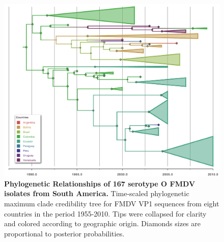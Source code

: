 \documentclass[10pt]{article}
\begin{document}
\newpage
\begin{figure}[!ht]
\begin{center}
\includegraphics[scale=.60]{FIGURES/O.pdf}
\end{center}
\caption{
{\bf Phylogenetic Relationships of 167 serotype O FMDV isolates from South America.} Time-scaled phylogenetic maximum clade credibility tree for FMDV VP1 sequences from eight countries in the period 1955-2010. Tips were collapsed for clarity and colored according to geographic origin. Diamonds sizes are proportional to posterior probabilities.\\
}
\label{fig:Otree}
\end{figure}
\newpage
\end{document}
